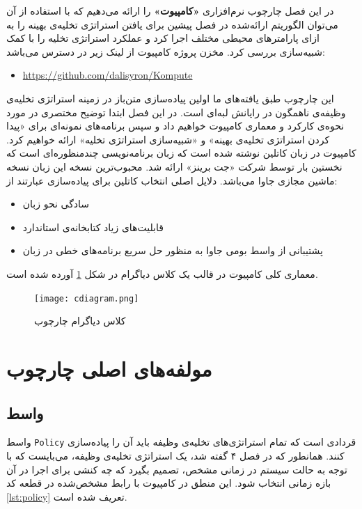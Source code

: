 در این فصل چارچوب نرم‌افزاری \textbf{«کامپیوت»} را ارائه می‌دهیم که با استفاده از آن می‌توان الگوریتم ارائه‌شده در فصل پیشین برای یافتن استراتژی تخلیه‌ی بهینه را به ازای پارامترهای محیطی مختلف اجرا کرد و عملکرد استراتژی تخلیه را با کمک شبیه‌سازی بررسی کرد. مخزن پروژه کامپیوت از لینک زیر در دسترس می‌باشد:
\begin{latin}
	\begin{itemize}
		\item \href{https://github.com/dalisyron/Kompute}{https://github.com/dalisyron/Kompute}
	\end{itemize}
\end{latin}
این چارچوب طبق یافته‌های ما اولین پیاده‌سازی متن‌باز در زمینه استراتژی تخلیه‌ی وظیفه‌ی ناهمگون در رایانش لبه‌ای است. در این فصل ابتدا توضیح مختصری در مورد نحوه‌ی کارکرد و معماری کامپیوت خواهیم داد و سپس برنامه‌های نمونه‌ای برای «پیدا کردن استراتژی تخلیه‌ی بهینه» و «شبیه‌سازی استراتژی تخلیه» ارائه خواهیم کرد. کامپیوت در زبان کاتلین نوشته شده است که زبان برنامه‌نویسی چندمنظوره‌ای است که نخستین بار توسط شرکت «جت برینز» ارائه شد. محبوب‌ترین نسخه این زبان نسخه ماشین مجازی جاوا می‌باشد. دلایل اصلی انتخاب کاتلین برای پیاده‌سازی \CurrentProject عبارتند از:
\begin{itemize}
	\item سادگی نحو زبان
	\item قابلیت‌های زیاد کتابخانه‌ی استاندارد
	\item پشتیبانی از واسط بومی جاوا به منظور حل سریع برنامه‌های خطی در زبان 
\end{itemize}
معماری کلی کامپیوت در قالب یک کلاس دیاگرام در شکل \ref{fig:classdiagram} آورده شده است. 
\begin{figure}
	\centering
	\texttt{[image: cdiagram.png]}
	\caption{کلاس دیاگرام چارچوب }
	\label{fig:classdiagram}
\end{figure}
\section{مولفه‌های اصلی چارچوب }
\subsection{واسط }
واسط \texttt{\footnotesize Policy} قردادی است که تمام استراتژی‌های تخلیه‌ی وظیفه باید آن را پیاده‌سازی کنند. همانطور که در فصل ۴ گفته شد، یک استراتژی تخلیه‌ی وظیفه، می‌بایست که با توجه به حالت سیستم در زمانی مشخص، تصمیم بگیرد که چه کنشی برای اجرا در آن بازه زمانی انتخاب شود. این منطق در کامپیوت با رابط مشخص‌شده در قطعه کد \ref{lst:policy} تعریف شده است.

